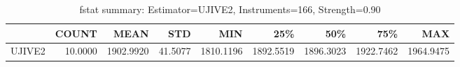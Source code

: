 \begin{table}[ht]
\centering
\caption{fstat summary: Estimator=UJIVE2, Instruments=166, Strength=0.90}
\begin{tabular}{lrrrrrrrr}
\toprule
 & COUNT & MEAN & STD & MIN & 25\% & 50\% & 75\% & MAX \\
\midrule
UJIVE2 & 10.0000 & 1902.9920 & 41.5077 & 1810.1196 & 1892.5519 & 1896.3023 & 1922.7462 & 1964.9475 \\
\bottomrule
\end{tabular}
\end{table}
